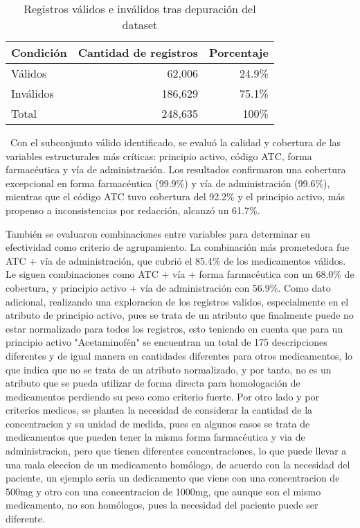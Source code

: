 \documentclass[conference]{IEEEtran}
\begin{document}
\begin{table}[htbp]
\caption{Registros válidos e inválidos tras depuración del dataset}
\begin{center}
\begin{tabular}{|l|r|r|}
\hline
\textbf{Condición} & \textbf{Cantidad de registros} & \textbf{Porcentaje} \\
\hline
Válidos   & 62,006   & 24.9\% \\
Inválidos & 186,629  & 75.1\% \\
\hline
Total     & 248,635  & 100\% \\
\hline
\end{tabular}
\label{tab:invima_validos}
\end{center}
\end{table}

\
Con el subconjunto válido identificado, se evaluó la calidad y cobertura de las variables estructurales más críticas: principio activo, código ATC, forma farmacéutica y vía de administración. Los resultados confirmaron una cobertura excepcional en forma farmacéutica (99.9\%) y vía de administración (99.6\%), mientras que el código ATC tuvo cobertura del 92.2\% y el principio activo, más propenso a inconsistencias por redacción, alcanzó un 61.7\%.

También se evaluaron combinaciones entre variables para determinar su efectividad como criterio de agrupamiento. La combinación más prometedora fue ATC + vía de administración, que cubrió el 85.4\% de los medicamentos válidos. Le siguen combinaciones como ATC + vía + forma farmacéutica con un 68.0\% de cobertura, y principio activo + vía de administración con 56.9\%. 
Como dato adicional, realizando una exploracion de los registros validos, especialmente en el atributo de principio activo, pues se trata de un atributo que finalmente puede no estar normalizado para todos los registros, esto teniendo en cuenta que para un principio activo "Acetaminofén" se encuentran un total de 175 descripciones diferentes y de igual manera en cantidades diferentes para otros medicamentos, lo que indica que no se trata de un atributo normalizado, y por tanto, no es un atributo que se pueda utilizar de forma directa para homologación de medicamentos perdiendo su peso como criterio fuerte.
Por otro lado y por criterios medicos, se plantea la necesidad de considerar la cantidad de la concentracion y su unidad de medida, pues en algunos casos se trata de medicamentos que pueden tener la misma forma farmacéutica y via de administracion, pero que tienen diferentes concentraciones, lo que puede llevar a una mala eleccion de un medicamento homólogo, de acuerdo con la necesidad del paciente, un ejemplo seria un dedicamento que viene con una concentracion de 500mg y otro con una concentracion de 1000mg, que aunque son el mismo medicamento, no son homólogos, pues la necesidad del paciente puede ser diferente.
\end{document}

